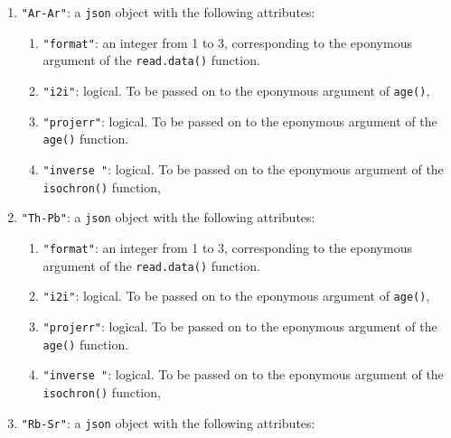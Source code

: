\begin{refsection}
\begin{enumerate}[leftmargin=\parindent,align=left,
      labelwidth=\parindent,label*=2.\arabic*.]
\begin{enumerate}[leftmargin=\parindent,align=left,labelwidth=\parindent,label*=\arabic*.]
    eponymous argument of the \texttt{read.data()} function.
  \item{\tt "commonPb"}: an integer between 0 and 3, to be supplied to
    the \texttt{option} argument of the \texttt{Pb0corr()} function.
  \item{\tt "inverse"}: logical. To be passed on to the eponymous
    argument of the \texttt{isochron()} function.
  \item{\tt "projerr"}: logical. To be passed on to the eponymous
    argument of the \texttt{age()} function.
  \end{enumerate}
\item{\tt "Ar-Ar"}: a \texttt{json} object with the following
  attributes:
  \begin{enumerate}[leftmargin=\parindent,align=left,labelwidth=\parindent,label*=\arabic*.]
  \item{\tt "format"}: an integer from 1 to 3, corresponding to the
    eponymous argument of the \texttt{read.data()} function.
  \item{\tt "i2i"}: logical. To be passed on to the eponymous argument
    of \texttt{age()},
  \item{\tt "projerr"}: logical. To be passed on to the eponymous
    argument of the \texttt{age()} function.
  \item{\tt "inverse "}: logical. To be passed on to the eponymous
    argument of the \texttt{isochron()} function,
  \end{enumerate}
\item{\tt "Th-Pb"}: a \texttt{json} object with the following
  attributes:
  \begin{enumerate}[leftmargin=\parindent,align=left,labelwidth=\parindent,label*=\arabic*.]
  \item{\tt "format"}: an integer from 1 to 3, corresponding to the
    eponymous argument of the \texttt{read.data()} function.
  \item{\tt "i2i"}: logical. To be passed on to the eponymous argument
    of \texttt{age()},
  \item{\tt "projerr"}: logical. To be passed on to the eponymous
    argument of the \texttt{age()} function.
  \item{\tt "inverse "}: logical. To be passed on to the eponymous
    argument of the \texttt{isochron()} function,
  \end{enumerate}
\item{\tt "Rb-Sr"}: a \texttt{json} object with the following
  attributes:
  \begin{enumerate}[leftmargin=\parindent,align=left,labelwidth=\parindent,label*=\arabic*.]

\end{enumerate}
\end{enumerate}
\end{refsection}
